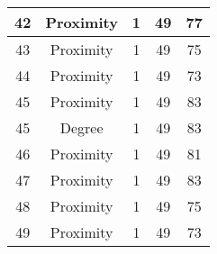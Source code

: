 \documentclass[results.tex]{subfiles}
\begin{document}
\begin{center}
\begin{tabular}{| c || c | c | c | c |}
            \hline
            42                      & Proximity                    & 1                      & 49                      & 77                   \\
            \hline
            43                      & Proximity                    & 1                      & 49                      & 75                   \\
            \hline
            44                      & Proximity                    & 1                      & 49                      & 73                   \\
            \hline
            45                      & Proximity                    & 1                      & 49                      & 83                   \\
            \hline
            45                      & Degree                       & 1                      & 49                      & 83                   \\
            \hline
            46                      & Proximity                    & 1                      & 49                      & 81                   \\
            \hline
            47                      & Proximity                    & 1                      & 49                      & 83                   \\
            \hline
            48                      & Proximity                    & 1                      & 49                      & 75                   \\
            \hline
            49                      & Proximity                    & 1                      & 49                      & 73                   \\
            \hline
        \end{tabular}
    \end{center}
\end{document}
